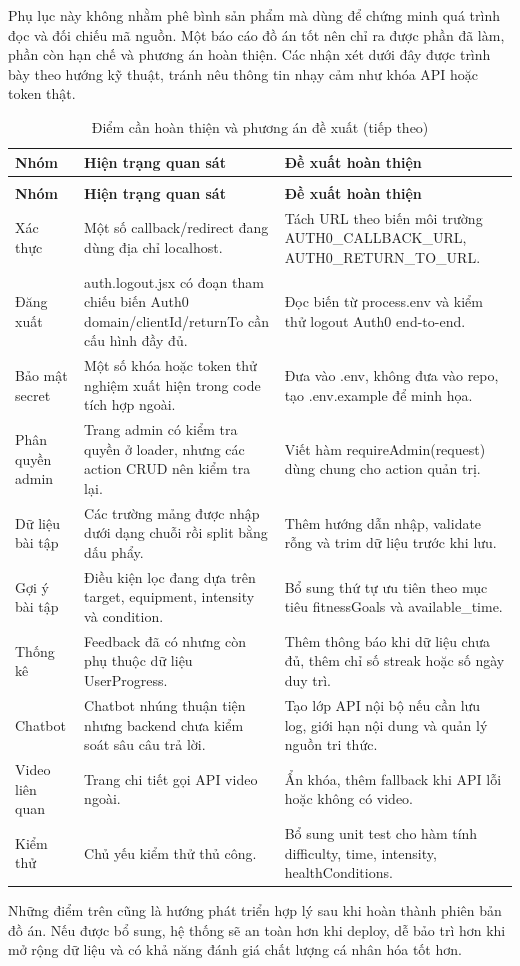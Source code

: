 
Phụ lục này không nhằm phê bình sản phẩm mà dùng để chứng minh quá trình đọc và đối chiếu mã nguồn. Một báo cáo đồ án tốt nên chỉ ra được phần đã làm, phần còn hạn chế và phương án hoàn thiện. Các nhận xét dưới đây được trình bày theo hướng kỹ thuật, tránh nêu thông tin nhạy cảm như khóa API hoặc token thật.


\begingroup
\setlength{\tabcolsep}{3pt}
\renewcommand{\arraystretch}{1.25}
\begin{longtable}{|P{0.220\textwidth}|P{0.330\textwidth}|P{0.370\textwidth}|}
\caption{Điểm cần hoàn thiện và phương án đề xuất}\\
\hline
\textbf{Nhóm} & \textbf{Hiện trạng quan sát} & \textbf{Đề xuất hoàn thiện} \\
\hline
\endfirsthead
\caption[]{Điểm cần hoàn thiện và phương án đề xuất (tiếp theo)}\\
\hline
\textbf{Nhóm} & \textbf{Hiện trạng quan sát} & \textbf{Đề xuất hoàn thiện} \\
\hline
\endhead
Xác thực & Một số callback/redirect đang dùng địa chỉ localhost. & Tách URL theo biến môi trường AUTH0\_CALLBACK\_URL, AUTH0\_RETURN\_TO\_URL. \\
\hline
Đăng xuất & auth.logout.jsx có đoạn tham chiếu biến Auth0 domain/clientId/returnTo cần cấu hình đầy đủ. & Đọc biến từ process.env và kiểm thử logout Auth0 end-to-end. \\
\hline
Bảo mật secret & Một số khóa hoặc token thử nghiệm xuất hiện trong code tích hợp ngoài. & Đưa vào .env, không đưa vào repo, tạo .env.example để minh họa. \\
\hline
Phân quyền admin & Trang admin có kiểm tra quyền ở loader, nhưng các action CRUD nên kiểm tra lại. & Viết hàm requireAdmin(request) dùng chung cho action quản trị. \\
\hline
Dữ liệu bài tập & Các trường mảng được nhập dưới dạng chuỗi rồi split bằng dấu phẩy. & Thêm hướng dẫn nhập, validate rỗng và trim dữ liệu trước khi lưu. \\
\hline
Gợi ý bài tập & Điều kiện lọc đang dựa trên target, equipment, intensity và condition. & Bổ sung thứ tự ưu tiên theo mục tiêu fitnessGoals và available\_time. \\
\hline
Thống kê & Feedback đã có nhưng còn phụ thuộc dữ liệu UserProgress. & Thêm thông báo khi dữ liệu chưa đủ, thêm chỉ số streak hoặc số ngày duy trì. \\
\hline
Chatbot & Chatbot nhúng thuận tiện nhưng backend chưa kiểm soát sâu câu trả lời. & Tạo lớp API nội bộ nếu cần lưu log, giới hạn nội dung và quản lý nguồn tri thức. \\
\hline
Video liên quan & Trang chi tiết gọi API video ngoài. & Ẩn khóa, thêm fallback khi API lỗi hoặc không có video. \\
\hline
Kiểm thử & Chủ yếu kiểm thử thủ công. & Bổ sung unit test cho hàm tính difficulty, time, intensity, healthConditions. \\
\hline
\end{longtable}
\endgroup

Những điểm trên cũng là hướng phát triển hợp lý sau khi hoàn thành phiên bản đồ án. Nếu được bổ sung, hệ thống sẽ an toàn hơn khi deploy, dễ bảo trì hơn khi mở rộng dữ liệu và có khả năng đánh giá chất lượng cá nhân hóa tốt hơn.

